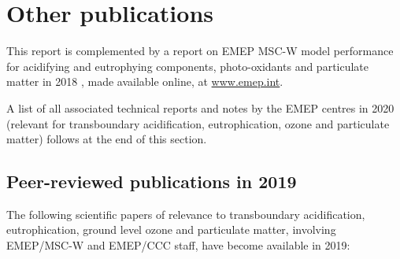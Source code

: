 \section{Other publications}
\label{sec:publ}
This report is complemented by a report on EMEP MSC-W model performance for acidifying and eutrophying components, photo-oxidants and particulate matter in 2018 \citep{WEB2020:Eval}, made available online, at \url{www.emep.int}.



A list of all associated technical reports and notes  by the EMEP
centres in 2020 (relevant for transboundary acidification, eutrophication,
ozone and particulate matter) follows at the end of this section.

\subsection*{Peer-reviewed publications in 2019}

The following scientific papers of relevance to transboundary acidification, eutrophication, ground level ozone and particulate matter, involving EMEP/MSC-W and EMEP/CCC staff, have become available in 2019:

